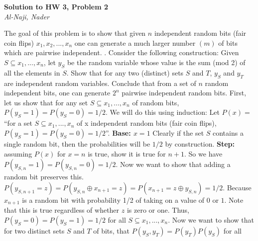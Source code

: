 \documentclass[12pt]{article}
\newcommand{\myhwtitle}[3]
{\begin{center}
{\large {\bf Solution to HW {#1}, Problem {#2}}}\\
\medskip 
{\it {#3}} %
\end{center}}
\begin{document}
\pagestyle{plain}

\myhwtitle{3}{2}{Al-Naji, Nader}

\bigskip

The goal of this problem is to show that given $n$ independent random bits (fair coin flips) $x_1, x_2, ..., x_n$ one can
generate a much larger number $(m)$ of bits which are pairwise independent.
\newline
{}. Consider the following construction: Given $S \subseteq {x_1, ... , x_n}$, let $y_S$ be the random variable whose
value is the sum (mod 2) of all the elements in $S$. Show that for any two (distinct) sets $S$ and $T$, $y_S$ and $y_T$
are independent random variables. Conclude that from a set of $n$ random independent bits, one can generate $2^n$ pairwise
independent random bits.
\newline
\newline
First, let us show that for any set $S \subseteq {x_1, ... , x_n}$ of random bits, $P(y_S = 1) = P(y_S = 0) = 1/2$.
We will do this using induction:
\newline
\newline
Let $P(x) = $ ``for a set $S \subseteq {x_1, ... , x_n}$ of x independent random bits (fair coin flips), $P(y_S = 1) = P(y_S = 0) = 1/2 $''.
\newline
\textbf{Base: $x = 1$}
\newline
Clearly if the set $S$ contains a single random bit, then the probabilities will be $1/2$ by construction.
\newline
\textbf{Step:} assuming $P(x)$ for $x = n$ is true, show it is true for $n+1$.
\newline
So we have $P(y_{S,n} = 1) = P(y_{S,n} = 0) = 1/2$. Now we want to show that adding a random bit preserves this.
\newline
$P(y_{S, n+1} = z) = P(y_{S,n} \oplus x_{n+1} = z) = P(x_{n+1} = z \oplus y_{S,n}) = 1/2$. 
\newline
Because $x_{n+1}$ is a random bit with probability 1/2 of taking on a value of $0$ or $1$. Note that this is true
regardless of whether $z$ is zero or one.
\newline
Thus, $P(y_S = 0) = P(y_S = 1) = 1/2$ for all $S \subseteq {x_1, ... , x_n}$.
\newline
\newline
Now we want to show that for two distinct sets $S$ and $T$ of bits, that $P(y_S, y_T) = P(y_T)P(y_S)$ for all
\end{document}
